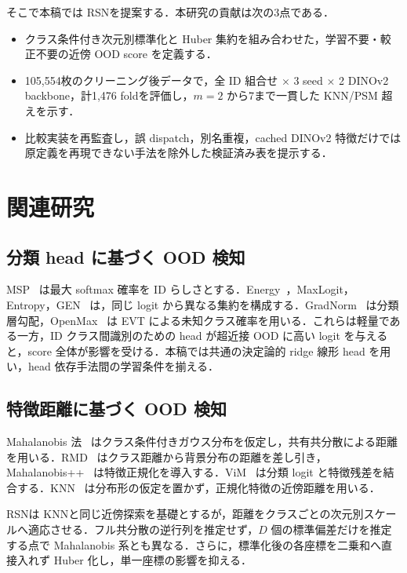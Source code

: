 \documentclass[uplatex,dvipdfmx,a4paper,10pt,twocolumn]{bxjsarticle}
\newcommand{\RSN}{RSN}
\newcommand{\knn}{KNN}
\begin{document}
そこで本稿では \RSN を提案する．本研究の貢献は次の3点である．
\begin{itemize}
  \item クラス条件付き次元別標準化と Huber 集約を組み合わせた，学習不要・較正不要の近傍 OOD score を定義する．
  \item 105,554枚のクリーニング後データで，全 ID 組合せ $\times$ 3 seed $\times$ 2 DINOv2 backbone，計1,476 foldを評価し，$m=2$ から7まで一貫した \knn/PSM 超えを示す．
  \item 比較実装を再監査し，誤 dispatch，別名重複，cached DINOv2 特徴だけでは原定義を再現できない手法を除外した検証済み表を提示する．
\end{itemize}

\section{関連研究}

\subsection{分類 head に基づく OOD 検知}

MSP~\cite{hendrycks2017baseline} は最大 softmax 確率を ID らしさとする．Energy~\cite{liu2020energy}，MaxLogit，Entropy，GEN~\cite{liu2023gen} は，同じ logit から異なる集約を構成する．GradNorm~\cite{huang2021gradnorm} は分類層勾配，OpenMax~\cite{bendale2016openmax} は EVT による未知クラス確率を用いる．これらは軽量である一方，ID クラス間識別のための head が超近接 OOD に高い logit を与えると，score 全体が影響を受ける．本稿では共通の決定論的 ridge 線形 head を用い，head 依存手法間の学習条件を揃える．

\subsection{特徴距離に基づく OOD 検知}

Mahalanobis 法~\cite{lee2018simple} はクラス条件付きガウス分布を仮定し，共有共分散による距離を用いる．RMD~\cite{ren2021simple} はクラス距離から背景分布の距離を差し引き，Mahalanobis++~\cite{muller2025mahalanobispp} は特徴正規化を導入する．ViM~\cite{wang2022vim} は分類 logit と特徴残差を結合する．\knn~\cite{sun2022knn} は分布形の仮定を置かず，正規化特徴の近傍距離を用いる．

\RSN は \knn と同じ近傍探索を基礎とするが，距離をクラスごとの次元別スケールへ適応させる．フル共分散の逆行列を推定せず，$D$ 個の標準偏差だけを推定する点で Mahalanobis 系とも異なる．さらに，標準化後の各座標を二乗和へ直接入れず Huber 化し，単一座標の影響を抑える．
\end{document}
